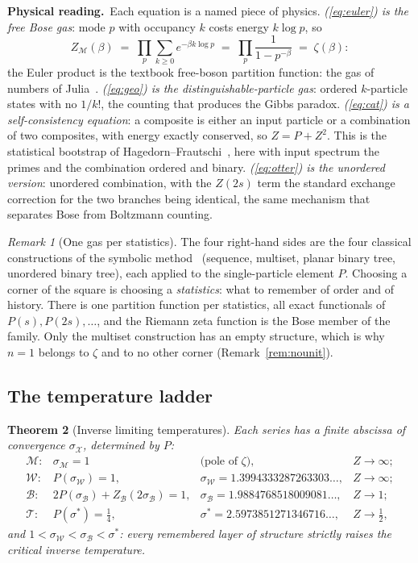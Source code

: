 \documentclass[11pt]{article}
\newcommand{\cT}{\mathcal{T}}   %
\newcommand{\cW}{\mathcal{W}}   %
\newcommand{\cB}{\mathcal{B}}   %
\newcommand{\cM}{\mathcal{M}}   %
\newcommand{\physread}{\medskip\noindent\textbf{Physical reading.}\ }
\numberwithin{equation}{section}
\theoremstyle{plain}
\newtheorem{theorem}{Theorem}[section]
\theoremstyle{definition}
\theoremstyle{remark}
\newtheorem{remark}[theorem]{Remark}
\begin{document}
\physread Each equation is a named piece of physics.
\emph{(\ref{eq:euler}) is the free Bose gas}: mode $p$ with occupancy $k$ costs energy
$k \log p$, so
\[
Z_\cM(\beta) \;=\; \prod_p \sum_{k \ge 0} e^{-\beta k \log p}
\;=\; \prod_p \frac{1}{1 - p^{-\beta}} \;=\; \zeta(\beta):
\]
the Euler product is the textbook free-boson partition function: the
gas of numbers of Julia~\cite{julia}.
\emph{(\ref{eq:geo}) is the distinguishable-particle gas}: ordered $k$-particle states
with no $1/k!$, the counting that produces the Gibbs paradox.
\emph{(\ref{eq:cat}) is a self-consistency equation}: a composite is either an input
particle or a combination of two composites, with energy exactly conserved, so
$Z = P + Z^2$. This is the statistical bootstrap of
Hagedorn--Frautschi~\cite{hagedorn,frautschi}, here with input spectrum the primes
and the combination ordered and binary.
\emph{(\ref{eq:otter}) is the unordered version}: unordered combination, with the
$Z(2s)$ term the standard exchange correction for the two branches being
identical, the same mechanism that separates Bose from Boltzmann counting.

\begin{remark}[One gas per statistics]\label{rem:species}
The four right-hand sides are the four classical constructions of the symbolic
method~\cite{flajolet} (sequence, multiset, planar binary tree, unordered binary
tree), each applied to the single-particle element $P$. Choosing a corner of the
square is choosing a \emph{statistics}: what to remember of order and of history.
There is one partition function per statistics, all exact functionals of
$P(s), P(2s), \dots$, and the Riemann zeta function is the Bose member of the family.
Only the multiset construction has an empty structure, which is why $n=1$ belongs to
$\zeta$ and to no other corner (Remark~\ref{rem:nounit}).
\end{remark}

\subsection{The temperature ladder}

\begin{theorem}[Inverse limiting temperatures]\label{thm:ladder}
Each series has a finite abscissa of convergence $\sigma_{\mathcal X}$, determined by
$P$:
\[
\begin{array}{llll}
\cM: & \sigma_\cM = 1 & \text{(pole of } \zeta), & Z \to \infty; \\[0.5mm]
\cW: & P(\sigma_\cW) = 1, & \sigma_\cW = 1.3994333287263303\dots, & Z \to \infty; \\[0.5mm]
\cB: & 2P(\sigma_\cB) + Z_\cB(2\sigma_\cB) = 1, & \sigma_\cB = 1.9884768518009081\dots, & Z \to 1; \\[0.5mm]
\cT: & P(\sigma^{*}) = \tfrac14, & \sigma^{*} = 2.5973851271346716\dots, & Z \to \tfrac12,
\end{array}
\]
and $1 < \sigma_\cW < \sigma_\cB < \sigma^{*}$: every remembered layer of structure
strictly raises the critical inverse temperature.
\end{theorem}
\end{document}
